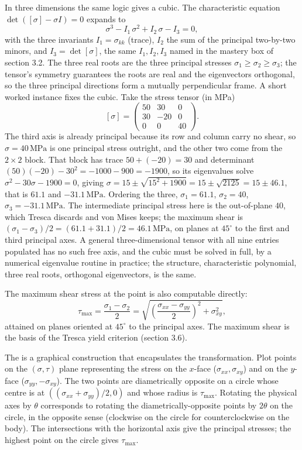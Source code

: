 In three dimensions the same logic gives a cubic. The characteristic
equation $\det([\sigma] - \sigma I) = 0$ expands to
\[
\sigma^3 - I_1\,\sigma^2 + I_2\,\sigma - I_3 = 0,
\]
with the three invariants $I_1 = \sigma_{kk}$ (trace), $I_2$ the sum of
the principal two-by-two minors, and $I_3 = \det[\sigma]$, the same
$I_1, I_2, I_3$ named in the mastery box of section 3.2. The three real
roots are the three principal stresses $\sigma_1 \geq \sigma_2 \geq
\sigma_3$; the tensor's symmetry guarantees the roots are real and the
eigenvectors orthogonal, so the three principal directions form a mutually
perpendicular frame. A short worked instance fixes the cubic. Take the
stress tensor (in MPa)
\[
[\sigma] = \begin{pmatrix} 50 & 30 & 0 \\ 30 & -20 & 0 \\ 0 & 0 & 40
\end{pmatrix}.
\]
The third axis is already principal because its row and column carry no
shear, so $\sigma = 40\,\text{MPa}$ is one principal stress outright, and
the other two come from the $2\times 2$ block. That block has trace $50 +
(-20) = 30$ and determinant $(50)(-20) - 30^2 = -1000 - 900 = -1900$, so
its eigenvalues solve $\sigma^2 - 30\sigma - 1900 = 0$, giving $\sigma =
15 \pm \sqrt{15^2 + 1900} = 15 \pm \sqrt{2125} = 15 \pm 46.1$, that is
$61.1$ and $-31.1\,\text{MPa}$. Ordering the three, $\sigma_1 = 61.1$,
$\sigma_2 = 40$, $\sigma_3 = -31.1\,\text{MPa}$. The intermediate
principal stress here is the out-of-plane $40$, which Tresca discards and
von Mises keeps; the maximum shear is $(\sigma_1 - \sigma_3)/2 = (61.1 +
31.1)/2 = 46.1\,\text{MPa}$, on planes at $45^\circ$ to the first and
third principal axes. A general three-dimensional tensor with all nine
entries populated has no such free axis, and the cubic must be solved in
full, by a numerical eigenvalue routine in practice; the structure,
characteristic polynomial, three real roots, orthogonal eigenvectors, is
the same.

The maximum shear stress at the point is also computable directly:
\[
\tau_{\max} = \frac{\sigma_1 - \sigma_2}{2} = \sqrt{\left(
\frac{\sigma_{xx} - \sigma_{yy}}{2}\right)^2 + \sigma_{xy}^2},
\]
attained on planes oriented at $45^{\circ}$ to the principal axes.
The maximum shear is the basis of the Tresca yield criterion (section
3.6).

The  is a graphical construction that
encapsulates the transformation. Plot points on the $(\sigma, \tau)$
plane representing the stress on the $x$-face ($\sigma_{xx},
\sigma_{xy}$) and on the $y$-face ($\sigma_{yy}, -\sigma_{xy}$). The
two points are diametrically opposite on a circle whose centre is at
$((\sigma_{xx} + \sigma_{yy})/2, 0)$ and whose radius is $\tau_{
\max}$. Rotating the physical axes by $\theta$ corresponds to
rotating the diametrically-opposite points by $2\theta$ on the
circle, in the opposite sense (clockwise on the circle for
counterclockwise on the body). The intersections with the
horizontal axis give the principal stresses; the highest point on
the circle gives $\tau_{\max}$.

